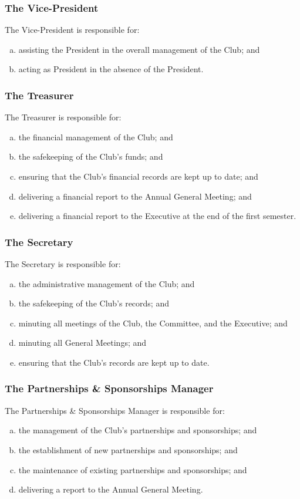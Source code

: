 \documentclass{constitution}
\begin{document}
\subsubsection{The Vice-President}
The Vice-President is responsible for:
\begin{enumerate}[(a)]
    \item assisting the President in the overall management of the Club; and
    \item acting as President in the absence of the President.
\end{enumerate}

\subsubsection{The Treasurer}
The Treasurer is responsible for:
\begin{enumerate}[(a)]
    \item the financial management of the Club; and
    \item the safekeeping of the Club's funds; and
    \item ensuring that the Club's financial records are kept up to date; and
    \item delivering a financial report to the Annual General Meeting; and
    \item delivering a financial report to the Executive at the end of the first semester.
\end{enumerate}

\subsubsection{The Secretary}
The Secretary is responsible for:
\begin{enumerate}[(a)]
    \item the administrative management of the Club; and
    \item the safekeeping of the Club's records; and
    \item minuting all meetings of the Club, the Committee, and the Executive; and
    \item minuting all General Meetings; and
    \item ensuring that the Club's records are kept up to date.
\end{enumerate}

\subsubsection{The Partnerships \& Sponsorships Manager}
The Partnerships \& Sponsorships Manager is responsible for:
\begin{enumerate}[(a)]
    \item the management of the Club's partnerships and sponsorships; and
    \item the establishment of new partnerships and sponsorships; and
    \item the maintenance of existing partnerships and sponsorships; and
    \item delivering a report to the Annual General Meeting.
\end{enumerate}
\end{document}
